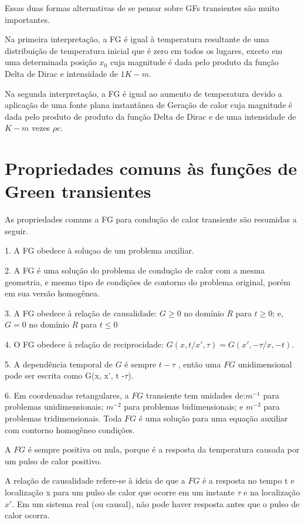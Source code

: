 Essas duas formas alternativas de se pensar sobre GFs transientes são muito importantes.
	
Na primeira interpretação, a FG é igual à temperatura resultante de uma distribuição de temperatura inicial que é zero em todos os lugares, exceto em uma determinada posição $x_0$ cuja magnitude é dada pelo produto da função Delta de Dirac e intensidade de $1 K-m$.
	
Na segunda interpretação, a FG é igual ao aumento de temperatura devido a aplicação de uma fonte plana instantânea de Geração de calor cuja magnitude é dada pelo produto de produto da função Delta de Dirac e de uma intensidade de $K-m$ vezes $\rho c$.	
	
\section{Propriedades comuns às funções de Green transientes}
As propriedades comuns a FG para condução de calor transiente são resumidas a seguir.

1. A FG obedece à soluçao de um problema auxiliar.
	
2. A FG é uma solução do problema de condução de calor com a mesma geometria, e mesmo tipo de condições de contorno do problema original, porém em sua versão homogênea.

3. A FG obedece à relação de causalidade: $G\geq 0$ no domínio $R$ para $t\geq 0$; e, $G = 0$ no domínio $R$ para $t \leq 0 $ 

4. O FG obedece à relação de reciprocidade: $G(x,t/x',\tau)= G(x',-\tau/x,-t)$. 

5. A dependência temporal de $G$ é sempre $t-\tau$ , então uma $FG$ unidimensional pode ser escrita como G(x, x', t -$\tau$).

6. Em coordenadas retangulares, a $FG$  transiente tem unidades de:$ m^{-1} $ para problemas unidimensionais; $ m^{-2} $ para problemas bidimensionais; e $ m^{-3} $ para problemas tridimensionais.
Toda $FG$ é uma solução para uma equação auxiliar com contorno homogêneo condições. 

A  $FG$  é sempre positiva ou nula, porque é a resposta da temperatura causada por um pulso de calor positivo. 
	
A relação de causalidade refere-se à ideia de que  a $FG$  é a resposta no tempo t e localização x para um pulso de calor que ocorre em um instante $\tau$ e na localização $x'$. Em um sistema real (ou causal), não pode haver resposta antes que o pulso de calor ocorra.

